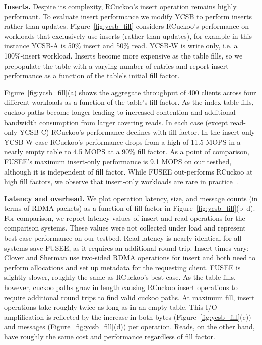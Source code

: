 \textbf{Inserts.}
Despite its complexity, RCuckoo's insert operation remains highly
performant.  To evaluate insert performance we modify YCSB to perform
inserts rather than updates.  Figure~\ref{fig:ycsb_fill} considers
RCuckoo's performance on workloads that exclusively use inserts (rather than
updates), for example in this instance YCSB-A is 50\% insert and 50\%
read. YCSB-W is write only, i.e. a 100\%-insert workload.  Inserts become
more expensive as the table fills, so we prepopulate the table with a varying number of entries and report insert performance as
a function of the table's initial fill factor.

Figure~\ref{fig:ycsb_fill}(a) shows the aggregate throughput of 400
clients across four different workloads as a function of the table's
fill factor.  As the index table fills, cuckoo paths become longer
leading to increased contention and additional bandwidth consumption
from larger covering reads. In each case (except read-only YCSB-C)
RCuckoo's performance declines with fill factor. In the insert-only
YCSB-W case RCuckoo's performance drops from a high of 11.5 MOPS in a
nearly empty table to 4.5 MOPS at a 90\% fill factor.  As a point of
comparison, FUSEE's maximum insert-only performance is 9.1 MOPS on our
testbed, although it is independent of fill factor.  While FUSEE
out-performs RCuckoo at high fill factors, we observe that 
insert-only workloads are rare in
practice~\cite{facebook-memcached}.

\textbf{Latency and overhead.}
We plot operation latency, size, and message counts (in
terms of RDMA packets) as a function of fill factor in
Figure~\ref{fig:ycsb_fill}(b--d).  For comparison, we report
latency values of insert and read operations for the
comparison systems. These values were not collected under
load and represent best-case performance on our testbed.
Read latency is nearly identical for all systems save FUSEE,
as it requires an additional round trip.  Insert times vary:
Clover and Sherman use two-sided RDMA operations for insert
and both need to perform allocations and set up metadata for
the requesting client.  FUSEE is slightly slower, roughly
the same as RCuckoo's best case.  As the table fills,
however, cuckoo paths grow in length causing RCuckoo insert
operations to require additional round trips to find valid
cuckoo paths.  At maximum fill, insert operations take
roughly twice as long as in an empty table. This I/O amplification
is reflected by the increase in both bytes (Figure~\ref{fig:ycsb_fill}(c)) and messages (Figure~\ref{fig:ycsb_fill}(d)) per
operation.  Reads, on the other hand, have roughly
the same cost and performance regardless of fill factor.


